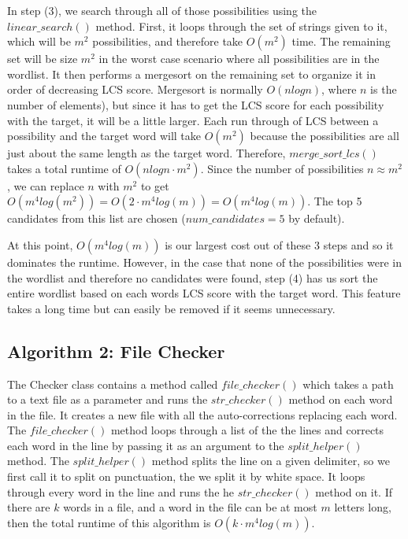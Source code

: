 \documentclass[10pt]{article}
\theoremstyle{definition}
\begin{document}
In step (3), we search through all of those possibilities using the $linear\_search()$ method. First, it loops through the set of strings given to it, which will be $m^2$ possibilities, and therefore take $O(m^2)$ time. The remaining set will be size $m^2$ in the worst case scenario where all possibilities are in the wordlist. It then performs a mergesort on the remaining set to organize it in order of decreasing LCS score. Mergesort is normally $O(nlogn)$, where $n$ is the number of elements), but since it has to get the LCS score for each possibility with the target, it will be a little larger. Each run  through of LCS between a possibility and the target word will take $O(m^2)$ because the possibilities are all just about the same length as the target word. Therefore, $merge\_sort\_lcs()$ takes a total runtime of $O(nlogn \cdot m^2)$. Since the number of possibilities $n \approx m^2$, we can replace $n$ with $m^2$ to get $O(m^4 log (m^2)) = O(2 \cdot m^4 log (m)) =  O(m^4 log (m)) $. The top 5 candidates from this list are chosen ($num\_candidates = 5$ by default).

At this point, $O(m^4 log (m))$ is our largest cost out of these 3 steps and so it dominates the runtime. However, in the case that none of the possibilities were in the wordlist and therefore no candidates were found, step (4) has us sort the entire wordlist based on each words LCS score with the target word. This feature takes a long time but can easily be removed if it seems unnecessary.


\subsection{Algorithm 2: File Checker}
The Checker class contains a method called $file\_checker()$ which takes a path to a text file as a parameter and runs the $str\_checker()$ method on each word in the file. It creates a new file with all the auto-corrections replacing each word. The $file\_checker()$ method loops through a list of the the lines and corrects each word in the line by passing it as an argument to the $split\_helper()$ method. The $split\_helper()$ method splits the line on a given delimiter, so we first call it to split on punctuation, the we split it by white space. It loops through every word in the line and runs the he $str\_checker()$ method on it. If there are $k$ words in a file, and a word in the file can be at most $m$ letters long, then the total runtime of this algorithm is $O(k \cdot m^4 log (m))$.
\end{document}
